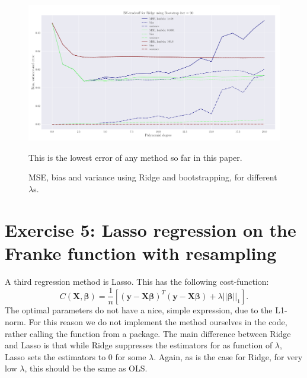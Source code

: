 \documentclass[reprint,english,notitlepage,aps,nobalancelastpage,nofootinbib]{revtex4-1}  %
\begin{document}
\begin{figure}[h]
	\includegraphics[width=\linewidth]{LBVT_Ridge_Bootstrap_n30_eps0_2_p20_lmbm8_2.pdf}
	\caption{MSE, bias and variance using Ridge and bootstrapping, for different $\lambda$s.}
	\label{fig:Ridge_boot_BVT}This is the lowest error of any method so far in this paper.
\end{figure}




\section*{Exercise 5: Lasso regression on the Franke function with resampling}

A third regression method is Lasso. This has the following cost-function:
\begin{equation*}
	C(\mathbf{X}, \boldsymbol{\beta}) = \frac{1}{n}\left[\left(\mathbf{y}-\mathbf{X}\boldsymbol\beta \right)^T \left(\mathbf{y}-\mathbf{X}\boldsymbol\beta \right)+\lambda ||\boldsymbol{\beta}||_1 \right].
\end{equation*}
The optimal parameters do not have a nice, simple expression, due to the L1-norm. For this reason we do not implement the method ourselves in the code, rather calling the function from a package.  The main difference between Ridge and Lasso is that while Ridge suppresses the estimators for as function of $\lambda$, Lasso sets the estimators to 0 for some $\lambda$. Again, as is the case for Ridge, for very low $\lambda$, this should be the same as OLS.
\end{document}
